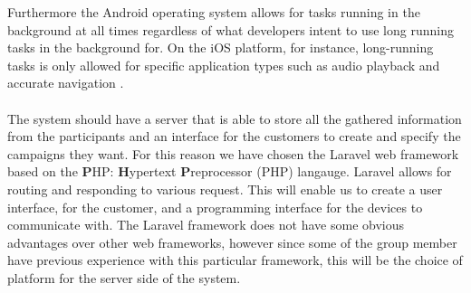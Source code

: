 Furthermore the Android operating system allows for tasks running in the background at all times regardless of what developers intent to use long running tasks in the background for. On the iOS platform, for instance, long-running tasks is only allowed for specific application types such as audio playback and accurate navigation \parencite{apple_long_running_task}.
\\\\
The system should have a server that is able to store all the gathered information from the participants and an interface for the customers to create and specify the campaigns they want. For this reason we have chosen the Laravel web framework based on the \textbf{P}HP: \textbf{H}ypertext \textbf{P}reprocessor (PHP) langauge. Laravel allows for routing and responding to various request. This will enable us to create a user interface, for the customer, and a programming interface for the devices to communicate with. The Laravel framework does not have some obvious advantages over other web frameworks, however since some of the group member have previous experience with this particular framework, this will be the choice of platform for the server side of the system.


